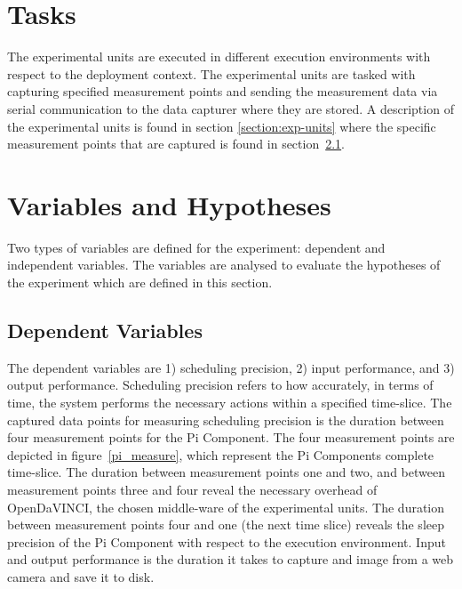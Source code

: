 \begin{center}\end{center}



\section{Tasks}
The experimental units are executed in different execution environments with respect to the deployment context. The experimental units are tasked with capturing specified measurement points and sending the measurement data via serial communication to the data capturer where they are stored. A description of the experimental units is found in section \ref{section:exp-units} where the specific measurement points that are captured is found in section~\ref{section:dependent}.


\section{Variables and Hypotheses} 
Two types of variables are defined for the experiment: dependent and independent variables. The variables are analysed to evaluate the hypotheses of the experiment which are defined in this section. 

\subsection{Dependent Variables} \label{section:dependent}

The dependent variables are 1) scheduling precision, 2) input performance, and 3) output performance. Scheduling precision refers to how accurately, in terms of time, the system performs the necessary actions within a specified time-slice. The captured data points for measuring scheduling precision is the duration between four measurement points for the Pi Component. The four measurement points are depicted in figure~\ref{pi_measure}, which represent the Pi Components complete time-slice. The duration between measurement points one and two, and between measurement points three and four reveal the necessary overhead of OpenDaVINCI, the chosen middle-ware of the experimental units. The duration between measurement points four and one (the next time slice) reveals the sleep precision of the Pi Component with respect to the execution environment. Input and output performance is the duration it takes to capture and image from a web camera and save it to disk.\\ 

